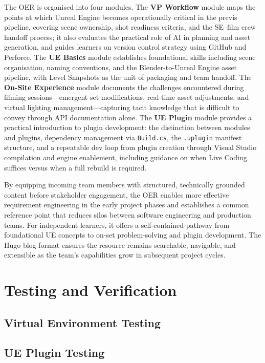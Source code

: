\documentclass[12pt,a4paper]{report}
\begin{document}
The OER is organised into four modules. The \textbf{VP Workflow} module maps the points at which Unreal Engine becomes operationally critical in the previs pipeline, covering scene ownership, shot readiness criteria, and the SE--film crew handoff process; it also evaluates the practical role of AI in planning and asset generation, and guides learners on version control strategy using GitHub and Perforce. The \textbf{UE Basics} module establishes foundational skills including scene organisation, naming conventions, and the Blender-to-Unreal Engine asset pipeline, with Level Snapshots as the unit of packaging and team handoff. The \textbf{On-Site Experience} module documents the challenges encountered during filming sessions---emergent set modifications, real-time asset adjustments, and virtual lighting management---capturing tacit knowledge that is difficult to convey through API documentation alone. The \textbf{UE Plugin} module provides a practical introduction to plugin development: the distinction between modules and plugins, dependency management via \texttt{Build.cs}, the \texttt{.uplugin} manifest structure, and a repeatable dev loop from plugin creation through Visual Studio compilation and engine enablement, including guidance on when Live Coding suffices versus when a full rebuild is required.

By equipping incoming team members with structured, technically grounded content before stakeholder engagement, the OER enables more effective requirement engineering in the early project phases and establishes a common reference point that reduces silos between software engineering and production teams. For independent learners, it offers a self-contained pathway from foundational UE concepts to on-set problem-solving and plugin development. The Hugo blog format ensures the resource remains searchable, navigable, and extensible as the team's capabilities grow in subsequent project cycles.

\chapter{Testing and Verification}

\section{Virtual Environment Testing}

\section{UE Plugin Testing}
\end{document}
